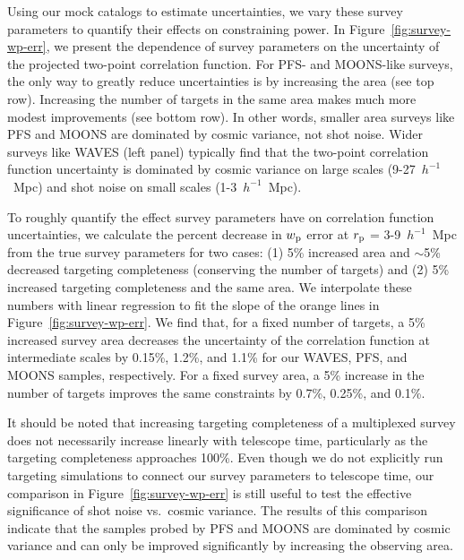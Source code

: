 \documentclass[twocolumn,twocolappendix]{aastex63}
\begin{document}
Using our mock catalogs to estimate uncertainties, we vary these survey parameters to quantify their effects on constraining power. In Figure~\ref{fig:survey-wp-err}, we present the dependence of survey parameters on the uncertainty of the projected two-point correlation function. For PFS- and MOONS-like surveys, the only way to greatly reduce uncertainties is by increasing the area (see top row). Increasing the number of targets in the same area makes much more modest improvements (see bottom row). In other words, smaller area surveys like PFS and MOONS are dominated by cosmic variance, not shot noise. Wider surveys like WAVES (left panel) typically find that the two-point correlation function uncertainty is dominated by cosmic variance on large scales (9-27~$h^{-1}$~Mpc) and shot noise on small scales (1-3~$h^{-1}$~Mpc).

To roughly quantify the effect survey parameters have on correlation function uncertainties, we calculate the percent decrease in $w_{\rm p}$ error at $r_{\rm p}$ = 3-9~$h^{-1}$~Mpc from the true survey parameters for two cases: (1) {5\% increased} area and {$\sim$5\% decreased targeting} completeness (conserving the number of targets) and (2) {5\% increased} {targeting} completeness and the same area. {We interpolate these numbers with} linear regression to fit the slope of the orange lines in Figure~\ref{fig:survey-wp-err}. We find that, {for a fixed number of targets, a 5\% increased} survey area decreases the uncertainty of the correlation function at intermediate scales by {0.15\%, 1.2\%, and 1.1\%} for our WAVES, PFS, and MOONS samples, respectively. For a fixed survey area, {a 5\% increase in} the number of targets improves the same constraints by {0.7\%, 0.25\%, and 0.1\%}.

{It should be noted that increasing targeting completeness of a multiplexed survey does not necessarily increase linearly with telescope time, particularly as the targeting completeness approaches 100\%. Even though we do not explicitly run targeting simulations to connect our survey parameters to telescope time, our comparison in Figure~\ref{fig:survey-wp-err} is still useful to test the effective significance of shot noise vs.\ cosmic variance. The results of this comparison indicate} that the samples probed by PFS and MOONS are dominated by cosmic variance and can only be improved significantly by increasing the observing area.
\end{document}
